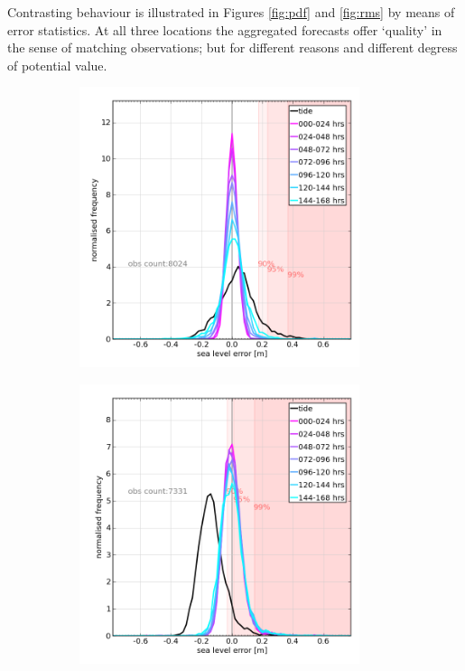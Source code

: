 Contrasting behaviour is illustrated in Figures \ref{fig:pdf} and \ref{fig:rms} by means of error statistics.
At all three locations the aggregated forecasts offer `quality' in the sense of matching observations; but for different reasons and different degress of potential value. 

\begin{figure}[!hbt] \centering
    \begin{subfigure}{0.30\textwidth}
    \includegraphics[width=0.9\textwidth]{figures/plots/0013_verify_pdf.png}
    \caption{}
    \end{subfigure}
    \begin{subfigure}{0.30\textwidth}
    \includegraphics[width=0.9\textwidth]{figures/plots/0043_verify_pdf.png}

\end{subfigure}
\end{figure}
